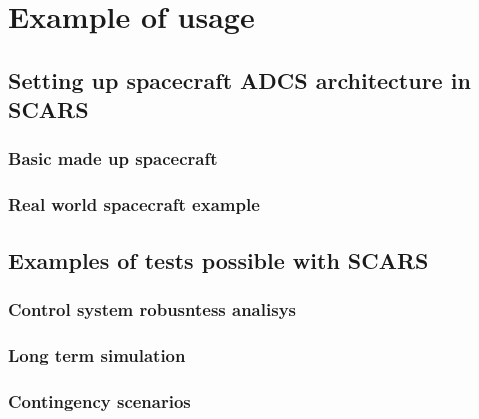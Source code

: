 \section{Example of usage}
\subsection{Setting up spacecraft ADCS architecture in SCARS}
\subsubsection{Basic made up spacecraft}
\subsubsection{Real world spacecraft example}
\subsection{Examples of tests possible with SCARS}
\subsubsection{Control system robusntess analisys}
\subsubsection{Long term simulation}
\subsubsection{Contingency scenarios}